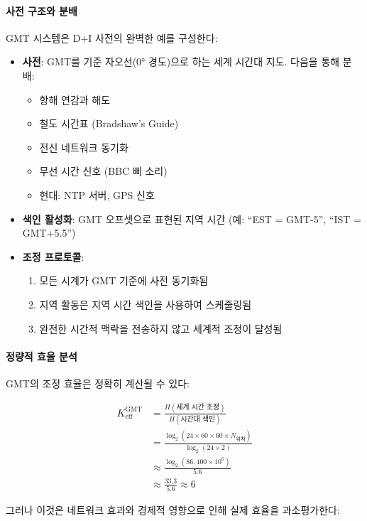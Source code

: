\documentclass[11pt,a4paper]{article}
\begin{document}
	\paragraph{사전 구조와 분배}
	GMT 시스템은 D+I 사전의 완벽한 예를 구성한다:
	
	\begin{itemize}
		\item \textbf{사전}: GMT를 기준 자오선(0° 경도)으로 하는 세계 시간대 지도. 다음을 통해 분배:
		\begin{itemize}
			\item 항해 연감과 해도
			\item 철도 시간표 (Bradshaw's Guide)
			\item 전신 네트워크 동기화
			\item 무선 시간 신호 (BBC 삐 소리)
			\item 현대: NTP 서버, GPS 신호
		\end{itemize}
		
		\item \textbf{색인 활성화}: GMT 오프셋으로 표현된 지역 시간 (예: ``EST = GMT-5'', ``IST = GMT+5.5'')
		
		\item \textbf{조정 프로토콜}: 
		\begin{enumerate}
			\item 모든 시계가 GMT 기준에 사전 동기화됨
			\item 지역 활동은 지역 시간 색인을 사용하여 스케줄링됨
			\item 완전한 시간적 맥락을 전송하지 않고 세계적 조정이 달성됨
		\end{enumerate}
	\end{itemize}
	
	\paragraph{정량적 효율 분석}
	GMT의 조정 효율은 정확히 계산될 수 있다:
	
	\begin{align}
		K_{\mathrm{eff}}^{\mathrm{GMT}} &= \frac{H(\text{세계 시간 조정})}{H(\text{시간대 색인})} \\
		&= \frac{\log_2\left(24 \times 60 \times 60 \times N_{\text{위치}}\right)}{\log_2(24 \times 2)} \\
		&\approx \frac{\log_2(86,400 \times 10^6)}{5.6} \\
		&\approx \frac{33.3}{5.6} \approx 6
	\end{align}
	
	그러나 이것은 네트워크 효과와 경제적 영향으로 인해 실제 효율을 과소평가한다:
	
\end{document}
